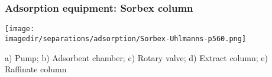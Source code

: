 \begin{frame}\frametitle{Adsorption equipment: Sorbex column}	
	\begin{center}
		\texttt{[image: \\imagedir/separations/adsorption/Sorbex-Uhlmanns-p560.png]}
	\end{center}
	
	{\scriptsize a) Pump; b) Adsorbent chamber; c) Rotary valve; d) Extract column; e) Raffinate column}
	
	
	
	
\end{frame}

